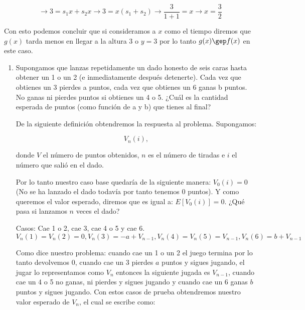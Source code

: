 \documentclass[12pt]{exam}
\begin{document}
\begin{enumerate}
\begin{enumerate}[label=b.]
\begin{equation}
    \rightarrow 3 = s_1x+s_2x \rightarrow 3 = x(s_1+s_2) \rightarrow \frac{3}{1+1} = x \rightarrow x = \frac{3}{2}
\end{equation}

\justify
Con esto podemos concluir que si consideramos a $x$ como el tiempo diremos que $g(x)$ tarda menos en llegar a la altura 3 o $y = 3$ por lo tanto $g(x) \gep f(x)$ en este caso.

\end{enumerate}

\begin{enumerate}[label=c.]
\item Supongamos que lanzas repetidamente un dado honesto de seis caras hasta obtener un 1 o un 2 (e inmediatamente despu\'es detenerte). Cada vez que obtienes un 3 pierdes a puntos, cada vez que obtienes un 6 ganas b puntos. No ganas ni pierdes puntos si obtienes un 4 o 5. ¿Cu\'al es la cantidad esperada de puntos (como funci\'on de a y b) que tienes al final?

\justify
De la siguiente definici\'on obtendremos la respuesta al problema. Supongamos:

\begin{equation}
    V_n(i),
\end{equation}

\justify
donde $V$ el número de puntos obtenidos, $n$ es el n\'umero de tiradas e $i$ el n\'umero que sali\'o en el dado.

\justify
Por lo tanto nuestro caso base quedar\'ia de la siguiente manera: $V_0(i) = 0$ (No se ha lanzado el dado todavía por tanto tenemos 0 puntos). Y como queremos el valor esperado, diremos que es igual a: $E[V_0(i)] = 0$. \mbox{¿}Qu\'e pasa si lanzamos $n$ veces el dado?

\justify
Casos: Cae 1 o 2, cae 3, cae 4 o 5 y cae 6.
\begin{equation}
    V_n(1) = V_n(2) = 0, V_n(3) = - a + V_{n-1}, V_n(4) = V_n(5) = V_{n-1}, V_n(6) = b + V_{n-1}
\end{equation}

\justify
Como dice nuestro problema: cuando cae un 1 o un 2 el juego termina por lo tanto devolvemos 0, cuando cae un 3 pierdes $a$ puntos y sigues jugando, el jugar lo representamos como $V_n$ entonces la siguiente jugada es $V_{n-1}$, cuando cae un 4 o 5 no ganas, ni pierdes y sigues jugando y cuando cae un 6 ganas $b$ puntos y sigues jugando. Con estos casos de prueba obtendremos nuestro valor esperado de $V_n$, el cual se escribe como:


\end{enumerate}
\end{enumerate}
\end{document}

